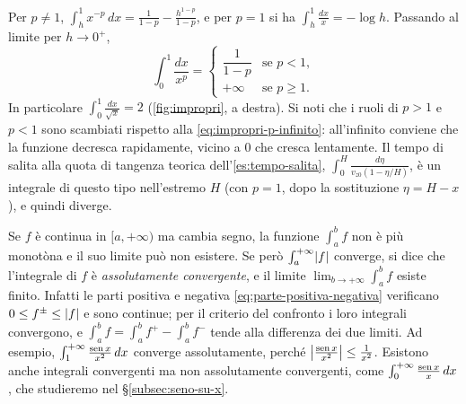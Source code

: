 \begin{esempio}\label{es:impropri-p-zero}
Per $p\neq1$, $\int_{h}^{1}x^{-p}\,dx=\frac1{1-p}-\frac{h^{1-p}}{1-p}$, e per $p=1$ si ha
$\int_{h}^{1}\frac{dx}x=-\log h$. Passando al limite per $h\to0^{+}$,
\begin{equation}\label{eq:impropri-p-zero}
  \int_{0}^{1}\frac{dx}{x^{p}}=
  \begin{cases} \dfrac1{1-p} & \text{se } p<1,\\[4pt] +\infty & \text{se } p\ge1 . \end{cases}
\end{equation}
In particolare $\int_{0}^{1}\frac{dx}{\sqrt x}=2$ (\cref{fig:impropri}, a destra). Si noti che i ruoli di
$p>1$ e $p<1$ sono scambiati rispetto alla \eqref{eq:impropri-p-infinito}: all'infinito
conviene che la funzione decresca rapidamente, vicino a $0$ che cresca lentamente. Il
tempo di salita alla quota di tangenza teorica dell'\cref{es:tempo-salita},
$\int_{0}^{H}\frac{d\eta}{v_{z0}(1-\eta/H)}$, è un integrale di questo tipo nell'estremo $H$ (con
$p=1$, dopo la sostituzione $\eta=H-x$), e quindi diverge.
\end{esempio}

\begin{osservazione}\label{oss:convergenza-assoluta}
Se $f$ è continua in $[a,+\infty)$ ma cambia segno, la funzione $\int_{a}^{b}f$ non è più
monotòna e il suo limite può non esistere. Se però $\int_{a}^{+\infty}\lvert f\rvert$ converge, si dice che
l'integrale di $f$ è \emph{assolutamente convergente}, e il limite
$\lim_{b\to+\infty}\int_{a}^{b}f$ esiste finito. Infatti le parti positiva e negativa
\eqref{eq:parte-positiva-negativa} verificano $0\le f^{\pm}\le\lvert f\rvert$ e sono continue; per il
criterio del confronto i loro integrali convergono, e
$\int_{a}^{b}f=\int_{a}^{b}f^{+}-\int_{a}^{b}f^{-}$ tende alla differenza dei due limiti. Ad esempio,
$\int_{1}^{+\infty}\frac{\operatorname{sen} x}{x^{2}}\,dx$ converge assolutamente, perché
$\bigl|\frac{\operatorname{sen} x}{x^{2}}\bigr|\le\frac1{x^{2}}$. Esistono anche integrali convergenti ma non
assolutamente convergenti, come $\int_{0}^{+\infty}\frac{\operatorname{sen} x}x\,dx$, che studieremo nel
\S\ref{subsec:seno-su-x}.
\end{osservazione}

